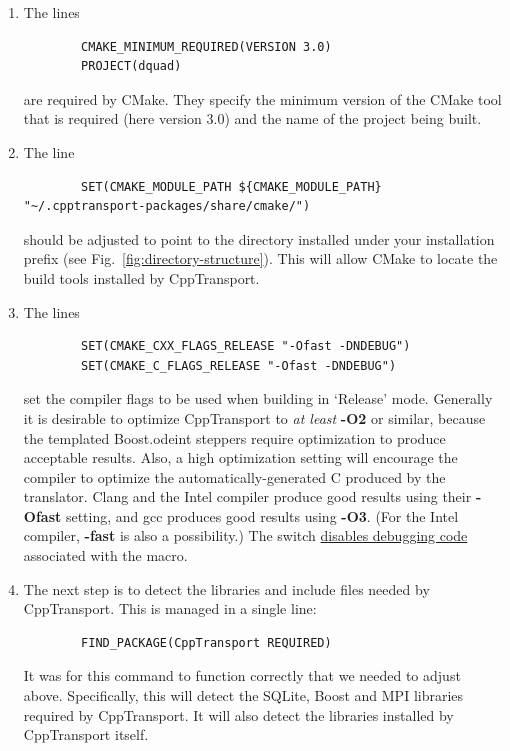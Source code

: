 \documentclass[11pt,a4paper]{article}
\renewcommand{\texttt}[1]{{\ttfamily\fontseries{l}\selectfont{#1}}}
\newcommand{\packagefont}{\sffamily}
\newcommand{\CppTransport}{{\packagefont CppTransport}}
\newcommand{\MPI}{{\packagefont MPI}}
\newcommand{\SQLite}{{\packagefont SQLite}}
\newcommand{\Boost}{{\packagefont Boost}}
\newcommand{\odeint}{{\packagefont odeint}}
\newcommand{\CMake}{{\packagefont CMake}}
\newcommand{\file}[1]{\texttt{{#1}}}
\newcommand{\cmakevar}[1]{\texttt{\textbf{\footnotesize #1}}}
\newcommand{\option}[1]{{\ttfamily\bfseries\small #1}}
\newcommand\CC{C\nolinebreak\hspace{-.05em}\raisebox{.4ex}{\relsize{-3}{\textbf{+}}}\nolinebreak\hspace{-.10em}\raisebox{.4ex}{\relsize{-3}{\textbf{+}}}}
\begin{document}
\begin{enumerate}
    \item The lines
    \begin{verbatim}
        CMAKE_MINIMUM_REQUIRED(VERSION 3.0)
        PROJECT(dquad)
    \end{verbatim}
    are required by {\CMake}.
    They specify the minimum version of the {\CMake} tool that is required
    (here version 3.0) and the name of the project being built.
    
    \item The line
    \begin{verbatim}
        SET(CMAKE_MODULE_PATH ${CMAKE_MODULE_PATH} "~/.cpptransport-packages/share/cmake/")
    \end{verbatim}
    should be adjusted to point to the \file{share/cmake} directory
    installed under your installation prefix
    (see Fig.~\ref{fig:directory-structure}).
    This will allow {\CMake} to locate the build tools installed by
    {\CppTransport}.
    
    \item The lines
    \begin{verbatim}
        SET(CMAKE_CXX_FLAGS_RELEASE "-Ofast -DNDEBUG")
        SET(CMAKE_C_FLAGS_RELEASE "-Ofast -DNDEBUG")
    \end{verbatim}
    set the compiler flags to be used when building in `Release' mode.
    Generally it is desirable to optimize {\CppTransport} to \emph{at least}
    \option{-O2} or similar, because the
    templated {\Boost}.{\odeint} steppers require optimization to produce
    acceptable results.
    Also, a high optimization setting will encourage the compiler
    to optimize the automatically-generated {\CC} produced by the translator.
    Clang and the Intel compiler produce good results using their
    \option{-Ofast} setting,
    and gcc produces good results using \option{-O3}.
    (For the Intel compiler, \option{-fast} is also a possibility.)
    The switch \texttt{-DNDEBUG}
    \href{http://en.cppreference.com/w/cpp/error/assert}{disables debugging code}
    associated with the
    \texttt{assert()} macro.
    
    \item
    The next step is to detect the libraries and include files needed by
    {\CppTransport}. This is managed in a single line:
    \begin{verbatim}
        FIND_PACKAGE(CppTransport REQUIRED)
    \end{verbatim}
    It was for this command to function correctly that we needed to
    adjust \cmakevar{CMAKE\_MODULE\_PATH} above.
    Specifically, this will detect the {\SQLite}, {\Boost} and {\MPI}
    libraries required by {\CppTransport}. It will also detect the
    libraries installed by {\CppTransport} itself.
    

\end{enumerate}
\end{document}
